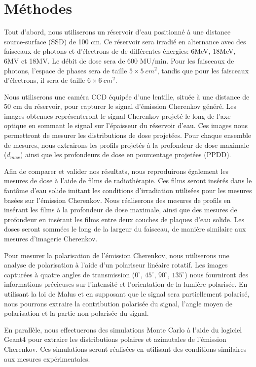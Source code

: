 \documentclass{Thesis}
\begin{document}
\section*{Méthodes}
Tout d'abord, nous utiliserons un réservoir d'eau positionné à une distance source-surface (SSD) de 100 cm.
Ce réservoir sera irradié en alternance avec des faisceaux de photons et d'électrons de de différentes énergies: 6MeV, 18MeV, 6MV et 18MV.
Le débit de dose sera de 600 MU/min.
Pour les faisceaux de photons, l'espace de phases sera de taille $5 \times \SI{5}{cm^2}$, tandis que pour les faisceaux d'électrons, il sera de taille $6 \times \SI{6}{cm^2}$.

Nous utiliserons une caméra CCD équipée d'une lentille, située à une distance de 50 cm du réservoir, pour capturer le signal d'émission Cherenkov généré.
Les images obtenues représenteront le signal Cherenkov projeté le long de l'axe optique en sommant le signal sur l'épaisseur du réservoir d'eau.
Ces images nous permettront de mesurer les distributions de dose projetées.
Pour chaque ensemble de mesures, nous extrairons les profils projetés à la profondeur de dose maximale ($d_{max}$) ainsi que les profondeurs de dose en pourcentage projetées (PPDD).

Afin de comparer et valider nos résultats, nous reproduirons également les mesures de dose à l'aide de films de radiothérapie.
Ces films seront insérés dans le fantôme d'eau solide imitant les conditions d'irradiation utilisées pour les mesures basées sur l'émission Cherenkov.
Nous réaliserons des mesures de profils en insérant les films à la profondeur de dose maximale, ainsi que des mesures de profondeur en insérant les films entre deux couches de plaques d'eau solide.
Les doses seront sommées le long de la largeur du faisceau, de manière similaire aux mesures d'imagerie Cherenkov.

Pour mesurer la polarisation de l'émission Cherenkov, nous utiliserons une analyse de polarisation à l'aide d'un polariseur linéaire rotatif.
Les images capturées à quatre angles de transmission ($0^\circ$, $45^\circ$, $90^\circ$, $135^\circ$) nous fourniront des informations précieuses sur l'intensité et l'orientation de la lumière polarisée.
En utilisant la loi de Malus et en supposant que le signal sera partiellement polarisé, nous pourrons extraire la contribution polarisée du signal, l'angle moyen de polarisation et la partie non polarisée du signal.

En parallèle, nous effectuerons des simulations Monte Carlo à l'aide du logiciel Geant4 pour extraire les distributions polaires et azimutales de l'émission Cherenkov.
Ces simulations seront réalisées en utilisant des conditions similaires aux mesures expérimentales.
\end{document}
